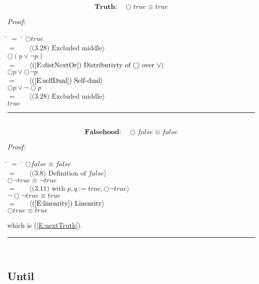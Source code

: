 \documentclass[fleqn, leqno]{article}
\newcommand{\lgap}{2pt}                             %
\newcommand{\mymathindent}{24pt}                    %
\newcommand{\Next}{\bigcirc}
\newcommand{\myqed}{\hfill\rule[-.23ex]{1.2ex}{2.0ex}}
\newcommand{\Gll} {\langle}                         %
\newcommand{\Ggg} {\rangle}                         %
\newcommand{\Hint}[1]     {\ \ \ $\Gll              \mbox{#1} \Ggg$ }   %
\begin{document}
\begin{equation}\label{E:nextTruth}
\textbf{Truth:}\quad \Next true \equiv true
\end{equation}

\emph{Proof:}
\begin{tabbing}
\hspace{\mymathindent} \= $= \;$ \= \kill
	\> \>   $\Next true$\\[\lgap]
	\> $=$  \>  \Hint{(3.28) Excluded middle}\\[\lgap]
	\> \>   $\Next(p \lor \lnot p)$\\[\lgap]
	\> $=$  \>  \Hint{(\ref{E:distNextOr}) Distributivty of $\Next$ over $\lor$}\\[\lgap]
	\> \>   $\Next p \lor \Next\lnot p$\\[\lgap]
	\> $=$  \>  \Hint{(\ref{E:selfDual}) Self-dual}\\[\lgap]
	\> \>   $\Next p \lor \lnot\Next p$\\[\lgap]
	\> $=$  \>  \Hint{(3.28) Excluded middle}\\[\lgap]
	\> \>   $true$\\[\lgap]
\end{tabbing}
\myqed\\[\lgap]


\begin{equation}\label{E:nextFalse}
\textbf{Falsehood:}\quad \Next false \equiv false
\end{equation}

\emph{Proof:}
\begin{tabbing}
\hspace{\mymathindent} \= $= \;$ \= \kill
  \> \>   $\Next false \equiv false$\\[\lgap]
  \> $=$  \>  \Hint{(3.8) Definition of $false$} \\[\lgap]
  \> \>   $\Next\lnot true \equiv \lnot true$\\[\lgap]
  \> $=$  \>  \Hint{(3.11) with $p,q := true, \Next\lnot true$}\\[\lgap]
  \> \>   $\lnot\Next\lnot true \equiv true$\\[\lgap]
  \> $=$  \>  \Hint{(\ref{E:linearity}) Linearity}\\[\lgap]
  \> \>   $\Next true \equiv true$\\[\lgap]
\end{tabbing}
which is (\ref{E:nextTruth}). \myqed\\[\lgap]

\subsection{Until}
\end{document}
